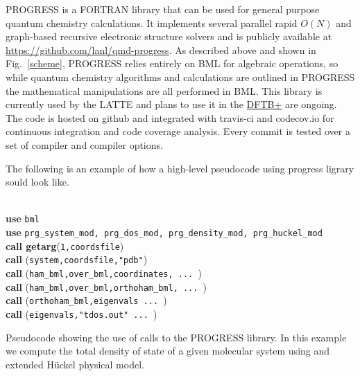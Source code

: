 PROGRESS is a FORTRAN library that can be used for general purpose quantum chemistry calculations. It implements several parallel rapid $O(N)$ and graph-based recursive electronic structure solvers and is publicly available at \url{https://github.com/lanl/qmd-progress}. As described above and shown in Fig.~\ref{scheme}, PROGRESS relies entirely on BML for algebraic operations, so while quantum chemistry algorithms and calculations are outlined in PROGRESS the mathematical manipulations are all performed in BML. This library is currently used by the LATTE and plans to use it in the \href{https://github.com/dftbplus/dftbplus}{DFTB+} are ongoing. The code is hosted on github \cite{bml} and integrated with travis-ci and codecov.io for continuous integration and code coverage analysis. Every commit is tested over a set of compiler and compiler options.


The following is an example of how a high-level pseudocode using progress ligrary sould look like.

\begin{algorithm}[H]
  \algrenewcommand{}
  \begin{algorithmic}
    \parskip 0.05cm
    {\fontsize{0.3cm}{0.3em}\selectfont 
       \\
        \State \textbf{use} \verb|bml|  \\
        \State {}        
        \State \textbf{use} \verb|prg_system_mod, prg_dos_mod, prg_density_mod, prg_huckel_mod| \\
        \State \textbf{call getarg}(\verb|1,coordsfile|) \\
        \State \textbf{call} (\verb|system,coordsfile,"pdb"|) \\
        \State \textbf{call} (\verb|ham_bml,over_bml,coordinates, ... |)\\
        \State \textbf{call} (\verb|ham_bml,over_bml,orthoham_bml, ... |)\\
        \State \textbf{call} (\verb|orthoham_bml,eigenvals ... |)\\
        \State \textbf{call} (\verb|eigenvals,"tdos.out" ... |)
      \EndFunction
    }       
  \end{algorithmic}
  \caption{Pseudocode showing the use of calls to the PROGRESS library. In this example we compute the total density of state of a given molecular system using and extended H\"{u}ckel physical model.}
  \label{huck}    
\end{algorithm}


